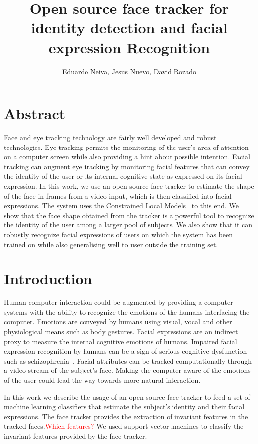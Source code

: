\documentclass[]{article}
\title{Open source face tracker for identity detection and facial expression Recognition}
\author{Eduardo Neiva, Jesus Nuevo, David Rozado}
\begin{document}
\maketitle

\section{Abstract}
Face and eye tracking technology are fairly well developed and robust
technologies. Eye tracking permits the monitoring of the user's area
of attention on a computer screen while also providing a hint about
possible intention. Facial tracking can augment eye tracking by
monitoring facial features that can convey the identity of the user or its
internal cognitive state as expressed on its facial expression. In
this work, we use an open source face tracker to estimate the shape of
the face in frames from a video input, which is then classified into
facial expressions. The system uses the Constrained Local
Models~\cite{saragih2011deformable} to this end. We show that the face
shape obtained from the tracker is a powerful tool to recognize the
identity of the user among a larger pool of
subjects. We also show that it can robustly recognize facial
expressions of users on which the system has been trained on
while also generalising well to user outside the training set.


\section{Introduction}
Human computer interaction could be augmented by providing a computer systems with the ability to recognize the emotions
of the humans interfacing the computer. Emotions are conveyed by humans using visual, vocal and other physiological
means such as body gestures. Facial expressions are an indirect proxy to measure the internal cognitive emotions of
humans. Impaired facial expression recognition by humans can be a sign of serious cognitive dysfunction such as
schizophrenia~\cite{Edwards2002789}. Facial attributes can be tracked computationally through a video stream of the
subject's face. Making the computer aware of the emotions of the user could lead the way towards more natural interaction.


In this work we describe the usage of an open-source face tracker to
feed a set of machine learning classifiers that estimate the subject's
identity and their facial expressions. The face tracker provides the
extraction of invariant features in the tracked
faces.\textcolor{red}{Which features?} We used support 
vector machines to classify the invariant features provided by the
face tracker.
\end{document}
